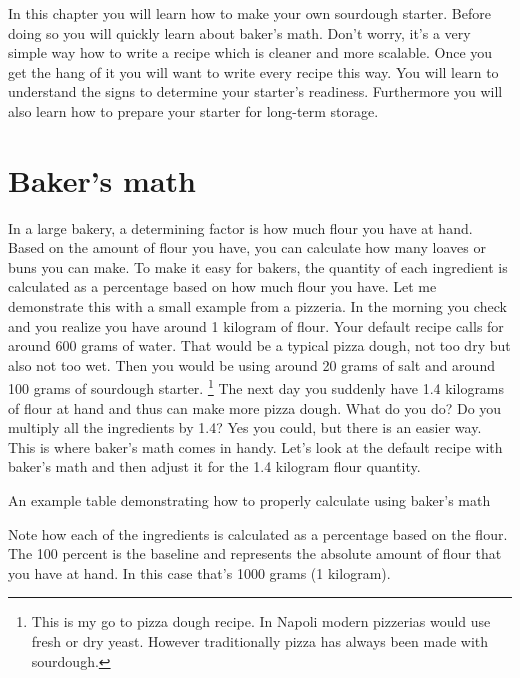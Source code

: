 In this chapter you will learn how to make your
own sourdough starter. Before doing so you will
quickly learn about baker's math. Don't worry,
it's a very simple way how to write a recipe which
is cleaner and more scalable. Once you get the hang
of it you will want to write every recipe this way.
You will learn to understand the signs to determine
your starter's readiness. Furthermore you will
also learn how to prepare your starter for long-term storage.

\section{Baker's math}
\label{section:bakers-math}

In a large bakery, a determining factor is how
much flour you have at hand. Based on the amount
of flour you have, you can calculate how many
loaves or buns you can make. To make it easy
for bakers, the quantity of each ingredient
is calculated as a percentage based on how much flour you have.
Let me demonstrate this with a small example from
a pizzeria. In the morning you check and you realize you
have around 1 kilogram of flour.
Your default recipe calls for around 600 grams of water.
That would be a typical pizza dough, not too dry but
also not too wet. Then you would be using around 20 grams
of salt and around 100 grams of sourdough starter.
\footnote{This is my go to pizza dough recipe. In Napoli
modern pizzerias would use fresh or dry yeast. However
traditionally pizza has always been made with sourdough.}
The next day you suddenly have 1.4 kilograms of flour
at hand and thus can make more pizza dough. What do you do?
Do you multiply all the ingredients by 1.4? Yes you could,
but there is an easier way. This is where baker's math
comes in handy. Let's look at the default recipe with baker's
math and then adjust it for the 1.4 kilogram flour quantity.

\begin{table}[!htb]
\begin{center}
  
  \caption{An example table demonstrating how to properly calculate using baker's math}
\end{center}
\end{table}

Note how each of the ingredients is calculated as a percentage
based on the flour. The 100 percent is the baseline and represents the absolute
amount of flour that you have at hand. In this case that's 1000 grams
(1 kilogram).

